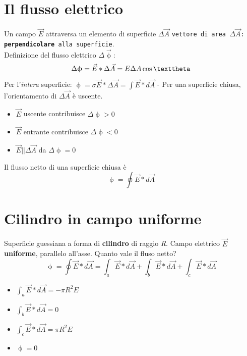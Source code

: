 \documentclass{book}
\begin{document}
\section {Il flusso elettrico}
Un campo $\vec{E}$ attraversa un elemento di superficie $\Delta \vec{A}$ \texttt{vettore di area $\Delta \vec{A}$: \textbf{perpendicolare} alla superficie}.\\ Definizione del flusso elettrico $\Delta \vec{\upphi}$:
\begin{equation}
	\Delta \upphi =\vec{E}*\Delta\vec{A}=E\Delta A\cos\texttheta
\end{equation}
Per l'\textit{intera} superficie:
$\upphi = \sigma \vec{E}*\Delta \vec{A}=\int \vec{E}*d\vec{A}$ - Per una superficie chiusa, l'orientamento di $\Delta \vec{A}$ è uscente.
\begin{itemize}
\item $\vec{E}$ uscente contribuisce $\Delta \upphi >0$
\item $\vec{E}$ entrante contribuisce $\Delta \upphi <0$
\item $\vec{E} || \Delta \vec{A}$ da $\Delta \upphi =0$
\end{itemize}
Il flusso netto di una superficie chiusa è
\begin{equation}
	\upphi=\oint \vec{E}*d\vec{A}
\end{equation}
\section{Cilindro in campo uniforme}
Superficie guessiana a forma di \textbf{cilindro} di raggio \textit{R}. Campo elettrico $\vec{E}$
\textbf{uniforme}, parallelo all'asse. Quanto vale il fluso netto?
\begin{equation}
  \upphi=\oint \vec{E}*d\vec{A}=\int_a \vec{E}*d\vec{A}+\int_b\vec{E}*d\vec{A}+\int_c \vec{E}*
  d\vec{A}
\end{equation}
\begin{itemize}
\item $\int_a \vec{E}*d\vec{A}=-\pi R^2E$
\item $\int_b \vec{E}*d\vec{A}=0$
\item $\int_c\vec{E}*d\vec{A}=\pi R^2E$
\item $\upphi =0$  
\end{itemize}
\end{document}
